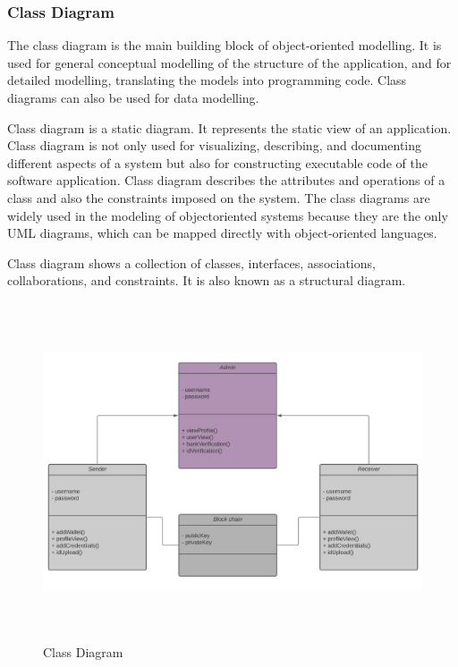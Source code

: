 \documentclass[12pt]{article}
\begin{document}
\newpage

\subsubsection{Class Diagram}

The class diagram is the main building block of object-oriented modelling. It is used for general conceptual modelling of the structure of the application, and for detailed modelling, translating the models into programming code. Class diagrams can also be used for data modelling.
\par Class diagram is a static diagram. It represents the static view of an application. Class diagram is not only used for visualizing, describing, and documenting different aspects of a system but also for constructing executable code of the software application. Class diagram describes the attributes and operations of a class and also the constraints imposed on the system. The class diagrams are widely used in the modeling of objectoriented systems because they are the only UML diagrams, which can be mapped directly with object-oriented languages.
\par Class diagram shows a collection of classes, interfaces, associations, collaborations, and constraints. It is also known as a structural diagram.

\begin{figure}[h!]
\begin{center}
\includegraphics[width=17cm, height=10cm]{CLS}
\caption{Class Diagram}
\end{center}
\end{figure}
\newpage
\end{document}
